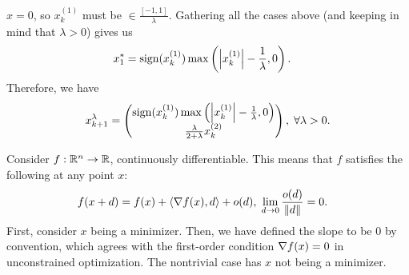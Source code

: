 \documentclass[10pt]{article}
\begin{document}
\begin{Exercise}
		$x = 0$, so $x_k^{(1)}$ must be $\in \frac{[-1, 1]}{\lambda}$. Gathering all the
		cases above (and keeping in mind that $\lambda > 0$) gives us
		\begin{align*}
			x_1^* &= \mathrm{sign}(x_k^{(1)}) \max\left(\left| x_k^{(1)} \right| -
				\frac{1}{\lambda}, 0\right).
		\end{align*}
		Therefore, we have
		\[
			x_{k+1}^{\lambda} = \begin{pmatrix}
				\mathrm{sign}(x_k^{(1)}) \max\left( \left| x_k^{(1)} \right| -
				\frac{1}{\lambda}, 0 \right) \\
				\frac{\lambda}{2 + \lambda} x_k^{(2)}
			\end{pmatrix}, \; \forall \lambda > 0.
		\]
\end{Exercise}

\begin{Exercise}
	Consider $f: \mathbb{R}^n \to \mathbb{R}$, continuously differentiable. This means that
	$f$ satisfies the following at any point $x$:
	\begin{align}
		f(x + d) &= f(x) + \left\langle \nabla f(x), d \right\rangle + o(d), \;
		\lim_{d \to 0} \frac{o(d)}{\left \| d \right \|} = 0.
		\label{eq:diff-defn}
	\end{align}
	First, consider $x$ being a minimizer. Then, we have defined the slope to
	be $0$ by convention, which agrees with the first-order condition $\nabla
	f(x) = 0$ in unconstrained optimization. The nontrivial case has $x$ not
	being a minimizer.


\end{Exercise}
\end{document}
